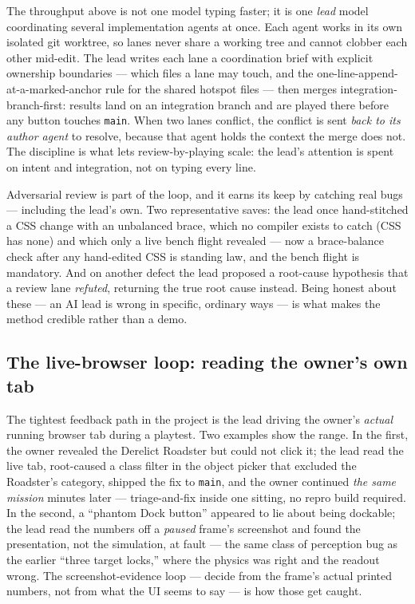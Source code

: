 \documentclass[10pt,twocolumn]{article}
\begin{document}
The throughput above is not one model typing faster; it is one \emph{lead} model
coordinating several implementation agents at once. Each agent works in its own isolated
git worktree, so lanes never share a working tree and cannot clobber each other mid-edit.
The lead writes each lane a coordination brief with explicit ownership boundaries --- which
files a lane may touch, and the one-line-append-at-a-marked-anchor rule for the shared
hotspot files --- then merges integration-branch-first: results land on an integration
branch and are played there before any button touches \texttt{main}. When two lanes
conflict, the conflict is sent \emph{back to its author agent} to resolve, because that
agent holds the context the merge does not. The discipline is what lets review-by-playing
scale: the lead's attention is spent on intent and integration, not on typing every line.

Adversarial review is part of the loop, and it earns its keep by catching real bugs ---
including the lead's own. Two representative saves: the lead once hand-stitched a CSS change
with an unbalanced brace, which no compiler exists to catch (CSS has none) and which only a
live bench flight revealed --- now a brace-balance check after any hand-edited CSS is
standing law, and the bench flight is mandatory. And on another defect the lead proposed a
root-cause hypothesis that a review lane \emph{refuted}, returning the true root cause
instead. Being honest about these --- an AI lead is wrong in specific, ordinary ways --- is
what makes the method credible rather than a demo.

\subsection{The live-browser loop: reading the owner's own tab}
\label{sec:livebrowser}

The tightest feedback path in the project is the lead driving the owner's \emph{actual}
running browser tab during a playtest. Two examples show the range. In the first, the owner
revealed the Derelict Roadster but could not click it; the lead read the live tab,
root-caused a class filter in the object picker that excluded the Roadster's category,
shipped the fix to \texttt{main}, and the owner continued \emph{the same mission} minutes
later --- triage-and-fix inside one sitting, no repro build required. In the second, a
``phantom Dock button'' appeared to lie about being dockable; the lead read the numbers off
a \emph{paused} frame's screenshot and found the presentation, not the simulation, at fault
--- the same class of perception bug as the earlier ``three target locks,'' where the
physics was right and the readout wrong. The screenshot-evidence loop --- decide from the
frame's actual printed numbers, not from what the UI seems to say --- is how those get
caught.
\end{document}
